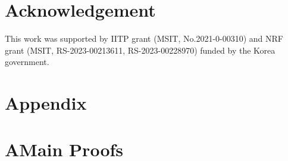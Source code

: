 \documentclass[letterpaper]{article} %
\begin{document}
\section{Acknowledgement}
This work was supported by IITP grant (MSIT, No.2021-0-00310) and NRF grant (MSIT, RS-2023-00213611, RS-2023-00228970) funded by the Korea government.





\newpage


\section{Appendix}
\section*{A\quad Main Proofs}
\end{document}
